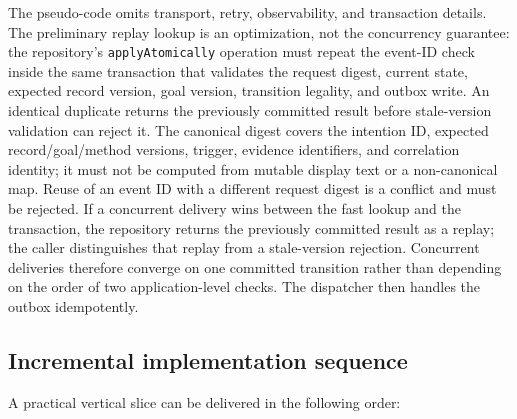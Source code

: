 The pseudo-code omits transport, retry, observability, and transaction details. The preliminary replay lookup is an optimization, not the concurrency guarantee: the repository's \texttt{applyAtomically} operation must repeat the event-ID check inside the same transaction that validates the request digest, current state, expected record version, goal version, transition legality, and outbox write. An identical duplicate returns the previously committed result before stale-version validation can reject it. The canonical digest covers the intention ID, expected record/goal/method versions, trigger, evidence identifiers, and correlation identity; it must not be computed from mutable display text or a non-canonical map. Reuse of an event ID with a different request digest is a conflict and must be rejected. If a concurrent delivery wins between the fast lookup and the transaction, the repository returns the previously committed result as a replay; the caller distinguishes that replay from a stale-version rejection. Concurrent deliveries therefore converge on one committed transition rather than depending on the order of two application-level checks. The dispatcher then handles the outbox idempotently.

\subsection{Incremental implementation sequence}

A practical vertical slice can be delivered in the following order:

